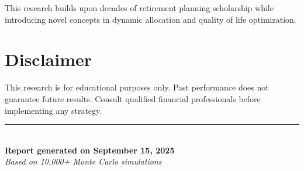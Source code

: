 \documentclass[11pt,letterpaper]{article}
\begin{document}
This research builds upon decades of retirement planning scholarship while introducing novel concepts in dynamic allocation and quality of life optimization.

\section*{Disclaimer}

This research is for educational purposes only. Past performance does not guarantee future results. Consult qualified financial professionals before implementing any strategy.

\vfill
\begin{center}
\rule{0.8\textwidth}{0.4pt}\\
\textbf{Report generated on September 15, 2025}\\
\textit{Based on 10,000+ Monte Carlo simulations}
\end{center}
\end{document}
